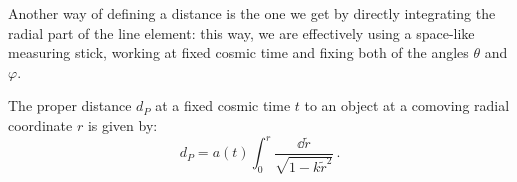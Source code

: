 \documentclass[main.tex]{subfiles}
\begin{document}







Another way of defining a distance is the one we get by directly integrating the radial part of the line element: this way, we are effectively using a space-like measuring stick, working at fixed cosmic time and fixing both of the angles \(\theta \) and \(\varphi \).



\begin{definition}
The proper distance \(d_P\) at a fixed cosmic time \(t \) to an object at a comoving radial coordinate \(r\) is given by: 
%
\begin{equation}
d_P = a(t) \int_0^r \frac{\dd{\widetilde{r}}}{\sqrt{1-k \widetilde{r}^2}}\,.
\end{equation}
\end{definition}
  
\end{document}
